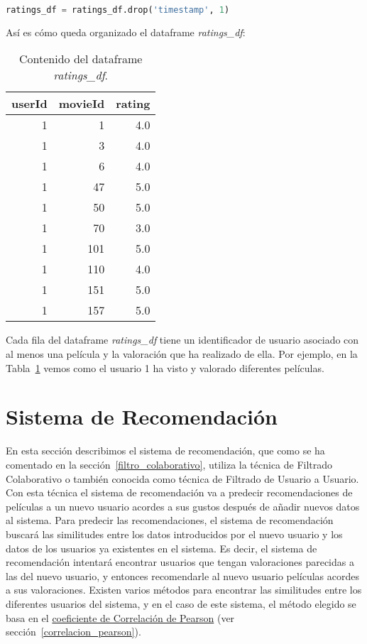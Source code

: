 \documentclass{uimppracticas}
\begin{document}
\begin{lstlisting}[language=python, basicstyle=\small]
ratings_df = ratings_df.drop('timestamp', 1)
\end{lstlisting}

Así es cómo queda organizado el dataframe \textit{ratings\_df}:

\begin{table}[H]
	\centering
	\begin{tabular}{rrr}
		\toprule
		userId &  movieId &  rating \\
		\midrule
		1 &        1 &     4.0 \\
		1 &        3 &     4.0 \\
		1 &        6 &     4.0 \\
		1 &       47 &     5.0 \\
		1 &       50 &     5.0 \\
		1 &       70 &     3.0 \\
		1 &      101 &     5.0 \\
		1 &      110 &     4.0 \\
		1 &      151 &     5.0 \\
		1 &      157 &     5.0 \\
		\bottomrule
	\end{tabular}
	\caption{Contenido del dataframe \textit{ratings\_df}.}
	\label{ratings_df_final}
\end{table}

Cada fila del dataframe \textit{ratings\_df} tiene un identificador de usuario asociado con al menos una película y la valoración que ha realizado de ella. Por ejemplo, en la Tabla~\ref{ratings_df_final} vemos como el usuario 1 ha visto y valorado diferentes películas.

\section{Sistema de Recomendación}\label{sistema_recomendacion}

En esta sección describimos el sistema de recomendación, que como se ha comentado en la sección~\ref{filtro_colaborativo}, utiliza la técnica de Filtrado Colaborativo o también conocida como técnica de Filtrado de Usuario a Usuario. Con esta técnica el sistema de recomendación va a predecir recomendaciones de películas a un nuevo usuario acordes a sus gustos después de añadir nuevos datos al sistema. Para predecir las recomendaciones, el sistema de recomendación buscará las similitudes entre los datos introducidos por el nuevo usuario y los datos de los usuarios ya existentes en el sistema. Es decir, el sistema de recomendación intentará encontrar usuarios que tengan valoraciones parecidas a las del nuevo usuario, y entonces recomendarle al nuevo usuario películas acordes a sus valoraciones. Existen varios métodos para encontrar las similitudes entre los diferentes usuarios del sistema, y en el caso de este sistema, el método elegido se basa en el \href{https://es.wikipedia.org/wiki/Coeficiente_de_correlaci\%C3\%B3n_de_Pearson}{coeficiente de Correlación de Pearson} (ver sección~\ref{correlacion_pearson}).
\end{document}
